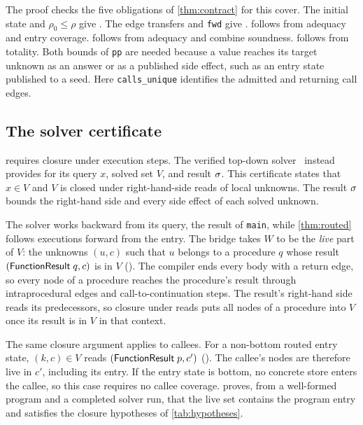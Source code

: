 The proof checks the five obligations of \cref{thm:contract} for this cover.
The initial state and $\rho_0 \leq \rho$ give . The edge
transfers and \texttt{fwd} give .  follows from adequacy and entry coverage.
 follows from adequacy and combine soundness.
 follows from totality. Both bounds of \texttt{pp} are needed because a
value reaches its target unknown as an answer or as a published side effect,
such as an entry state published to a seed.
Here \texttt{calls\_unique} identifies the admitted and returning call edges.

\subsection{The solver certificate}

 requires closure under execution steps. The verified
top-down solver~\cite{tilscher26} instead provides 
for its query $x$, solved set $V$, and result $\sigma$. This certificate states
that $x \in V$ and $V$ is closed under right-hand-side reads of local unknowns.
The result $\sigma$ bounds the right-hand side and every side effect of each
solved unknown.

The solver works backward from its query, the result of
\texttt{main}, while \cref{thm:routed} follows executions forward from the
entry. The bridge takes $W$ to be the \emph{live} part of $V$: the unknowns $(u, c)$
such that $u$ belongs to a procedure $q$ whose result
$(\textsf{FunctionResult}\;q, c)$ is in $V$ (). The
compiler ends every body with a return edge, so every node of a procedure
reaches the procedure's result through intraprocedural edges and
call-to-continuation steps. The result's right-hand side reads its
predecessors, so closure under reads puts all nodes of a procedure into $V$
once its result is in $V$ in that context.

The same closure argument applies to callees. For a non-bottom routed entry state, $(k,c) \in V$ reads
$(\textsf{FunctionResult}\;p,c')$ (). The callee's nodes are therefore live in
$c'$, including its entry. If the entry state is bottom, no concrete store enters
the callee, so this case requires no callee coverage.
 proves, from a well-formed
program and a completed solver run, that the live set contains the program entry
and satisfies the closure hypotheses of \cref{tab:hypotheses}.

